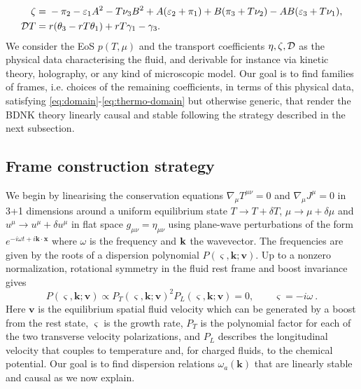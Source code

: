 \begin{align}
 \zeta={}&-\pi_2-\varepsilon_1A^2-T\nu_3B^2+A(\varepsilon_2+\pi_1)
       +B(\pi_3+T\nu_2)-AB(\varepsilon_3+T\nu_1),\nonumber\\
 \mathcal D T={}&r(\theta_3-rT\theta_1)+rT\gamma_1-\gamma_3.\label{eq:matching}
\end{align}
We consider the EoS $p(T,\mu)$ and the transport coefficients $\eta,\zeta,\mathcal D$ as the physical data characterising the fluid, and derivable for instance via kinetic theory, holography, or any kind of microscopic model. Our goal is to find families of frames, i.e. choices of the remaining coefficients, in terms of this physical data, satisfying \eqref{eq:domain}-\eqref{eq:thermo-domain} but otherwise generic, that render the BDNK theory linearly causal and stable following the strategy described in the next subsection. 

\subsection{Frame construction strategy}\label{sec:construction-strategy}
We begin by linearising the conservation equations $\nabla_\mu T^{\mu\nu}=0$ and
$\nabla_\mu J^\mu=0$ in 3+1 dimensions around a uniform equilibrium state $T\to T+\delta T$, $\mu\to\mu+\delta \mu$ and $u^\mu\to u^\mu+\delta u^\mu$ in flat space $g_{\mu\nu}=\eta_{\mu\nu}$ using plane-wave
perturbations of the form $e^{-i\omega t+i\mathbf k\cdot\mathbf x}$ where $\omega$ is the frequency and $\bold k$ the wavevector.
The frequencies are given by the roots of a dispersion polynomial $P(\varsigma,\mathbf k;\mathbf v)$. Up to a nonzero
normalization, rotational symmetry in the fluid rest frame and boost invariance \cite{Kovtun2019,HoultKovtun} gives
\begin{equation}\label{eq:strategy-full-polynomial}
 P(\varsigma,\mathbf k;\mathbf v)
 \propto P_T(\varsigma,\mathbf k;\mathbf v)^2P_L(\varsigma,\mathbf k;\mathbf v)=0,
 \qquad \varsigma=-i\omega~.
\end{equation}
Here $\mathbf v$ is the equilibrium spatial fluid velocity which can be generated by a boost from the rest state, $\varsigma$ is the growth rate,
$P_T$ is the polynomial factor for each of the two transverse velocity
polarizations, and $P_L$ describes the longitudinal velocity that couples
to temperature and, for charged fluids, to the chemical potential. Our goal is to find dispersion relations $\omega_a(\mathbf k)$ that are linearly stable and causal as we now explain. 


